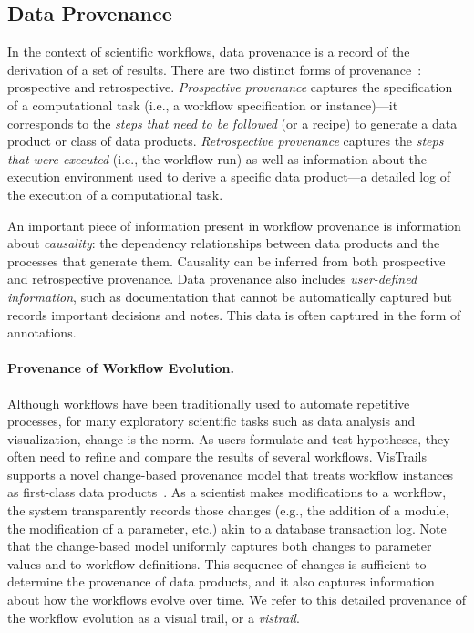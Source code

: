 \documentclass[12pt]{iopart}
\makeatletter
\newcommand{\eg}{e.g.,\xspace}
\newcommand{\ie}{i.e.,\xspace}
\newcommand{\etc}{etc.\@\xspace}
\makeatother
\begin{document}
\subsection{Data Provenance}
In the context of scientific workflows, data provenance is a record of
the derivation of a set of results. There are two distinct forms of
provenance~\cite{VDL:Challenge06}: prospective and retrospective.
\emph{Prospective provenance} captures the specification of a
computational task (\ie a workflow specification or instance)---it
corresponds to the \emph{steps that need to be followed} (or a recipe)
to generate a data product or class of data products.
\emph{Retrospective provenance} captures the \emph{steps that were
 executed} (\ie the workflow run) as well as information about the
execution environment used to derive a specific data product---a
detailed log of the execution of a computational task.

An important piece of information present in workflow provenance is
information about \emph{causality}: the dependency relationships
between data products and the processes that generate them. Causality
can be inferred from both prospective and retrospective provenance.
Data provenance also includes \emph{user-defined information}, such as
documentation that cannot be automatically captured but records
important decisions and notes. This data is often captured in the
form of annotations.

\paragraph{Provenance of Workflow Evolution.}
%
Although workflows have been traditionally used to automate repetitive
processes, for many exploratory scientific tasks such as data analysis
and visualization, change is the norm. As users formulate and test
hypotheses, they often need to refine and compare the results of
several workflows. VisTrails~\cite{vistrails} supports a novel
change-based provenance model that treats workflow instances as
first-class data
products~\cite{Freire:2006:IPAW,callahan@sciflow2006}. As a scientist
makes modifications to a workflow, the system transparently records
those changes (\eg the addition of a module, the modification of a
parameter, \etc) akin to a database transaction log. Note that the
change-based model uniformly captures both changes to parameter values
and to workflow definitions. This sequence of changes is sufficient to
determine the provenance of data products, and it also captures
information about how the workflows evolve over time. We refer to
this detailed provenance of the workflow evolution as a visual trail,
or a \emph{vistrail}.
\end{document}
